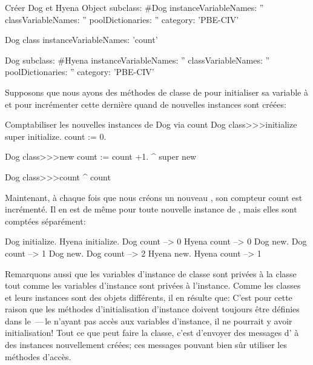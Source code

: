 \documentclass[a4paper,10pt,twoside]{book}
\begin{document}
\begin{classdef}[dog]{Créer Dog et Hyena}
Object subclass: #Dog
	instanceVariableNames: ''
	classVariableNames: ''
	poolDictionaries: ''
	category: 'PBE-CIV'

Dog class
	instanceVariableNames: 'count'

Dog subclass: #Hyena
	instanceVariableNames: ''
	classVariableNames: ''
	poolDictionaries: ''
	category: 'PBE-CIV'
\end{classdef}

Supposons que nous ayons des méthodes de classe de  pour initialiser sa variable  à  et pour incrémenter cette dernière quand de nouvelles instances sont créées:
\begin{method}[dogcount]{Comptabiliser les nouvelles instances de Dog via count}
Dog class>>>initialize
	super initialize.
	count := 0.

Dog class>>>new
	count := count +1.
	^ super new

Dog class>>>count
	^ count
\end{method}

Maintenant, à chaque fois que nous créons un nouveau , son compteur
count est incrémenté. Il en est de même pour toute nouvelle instance de , mais elles sont comptées séparément:
\begin{code}{}
Dog initialize.
Hyena initialize.
Dog count     --> 0
Hyena count --> 0
Dog new.
Dog count     --> 1
Dog new.
Dog count     --> 2
Hyena new.
Hyena count --> 1
\end{code}

Remarquons aussi que les variables d'instance de classe sont privées à la classe tout comme les variables d'instance sont privées à l'instance. 
Comme les classes et leurs instances sont des objets différents,
il en résulte que:
C'est pour cette raison que les méthodes d'initialisation d'instance doivent 
toujours être définies dans le \,---\,le  n'ayant pas accès aux variables d'instance, il ne pourrait y avoir initiali\-sation!  
Tout ce que peut faire la classe, c'est d'envoyer des messages d' à des instances nouvellement créées; ces messages pouvant bien sûr utiliser les méthodes d'accès.
\end{document}
